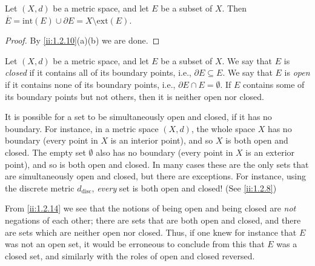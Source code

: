\begin{cor}\label{ii:1.2.11}
  Let \((X, d)\) be a metric space, and let \(E\) be a subset of \(X\).
  Then \(\overline{E} = \text{int}(E) \cup \partial E = X \setminus \text{ext}(E)\).
\end{cor}

\begin{proof}
  By \cref{ii:1.2.10}(a)(b) we are done.
\end{proof}

\begin{defn}\label{ii:1.2.12}
  Let \((X, d)\) be a metric space, and let \(E\) be a subset of \(X\).
  We say that \(E\) is \emph{closed} if it contains all of its boundary points, i.e., \(\partial E \subseteq E\).
  We say that \(E\) is \emph{open} if it contains none of its boundary points, i.e., \(\partial E \cap E = \emptyset\).
  If \(E\) contains some of its boundary points but not others, then it is neither open nor closed.
\end{defn}

\setcounter{thm}{13}
\begin{rmk}\label{ii:1.2.14}
  It is possible for a set to be simultaneously open and closed, if it has no boundary.
  For instance, in a metric space \((X, d)\), the whole space \(X\) has no boundary (every point in \(X\) is an interior point), and so \(X\) is both open and closed.
  The empty set \(\emptyset\) also has no boundary (every point in \(X\) is an exterior point), and so is both open and closed.
  In many cases these are the only sets that are simultaneously open and closed, but there are exceptions.
  For instance, using the discrete metric \(d_{\text{disc}}\), \emph{every} set is both open and closed! (See \cref{ii:1.2.8})
\end{rmk}

\begin{note}
  From \cref{ii:1.2.14} we see that the notions of being open and being closed are \emph{not} negations of each other;
  there are sets that are both open and closed, and there are sets which are neither open nor closed.
  Thus, if one knew for instance that \(E\) was not an open set, it would be erroneous to conclude from this that \(E\) was a closed set, and similarly with the roles of open and closed reversed.
\end{note}

